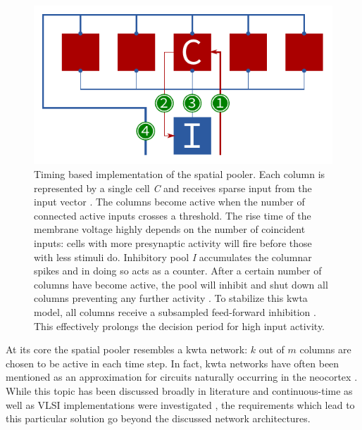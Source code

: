 \begin{figure}
	\begin{center}
		\includegraphics[width=\columnwidth]{../circuitry/spatial_pooler.pdf}
	\end{center}
	\caption{Timing based implementation of the spatial pooler. Each column is represented by a single cell \emph{C} and receives sparse input from the input vector \protect{}. The columns become active when the number of connected active inputs crosses a threshold. The rise time of the membrane voltage highly depends on the number of coincident inputs: cells with more presynaptic activity will fire before those with less stimuli do. Inhibitory pool \emph{I} accumulates the columnar spikes \protect{} and in doing so acts as a counter. After a certain number of columns have become active, the pool will inhibit and shut down all columns preventing any further activity \protect{}. To stabilize this \gls{kwta} model, all columns receive a subsampled feed-forward inhibition \protect{}. This effectively prolongs the decision period for high input activity.}
	\label{fig:spatial_pooler}
\end{figure}

At its core the spatial pooler resembles a \gls{kwta} network: $k$ out of $m$ columns are chosen to be active in each time step. In fact, \gls{kwta} networks have often been mentioned as an approximation for circuits naturally occurring in the neocortex \citep{felch2008hypergeometric}. While this topic has been discussed broadly in literature and continuous-time as well as VLSI implementations were investigated \citep{erlanson1991analog,tymoshchuk2012,maass2000neural}, the requirements which lead to this particular solution go beyond the discussed network architectures.

